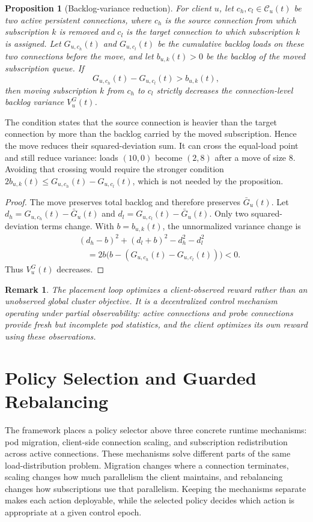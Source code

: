\documentclass[manuscript]{acmart}
\newtheorem{proposition}{Proposition}
\newtheorem{remark}{Remark}
\begin{document}
\begin{proposition}[Backlog-variance reduction]
For client $u$, let $c_h,c_l\in\mathcal{C}_u(t)$ be two active persistent
connections, where $c_h$ is the source connection from which subscription $k$
is removed and $c_l$ is the target connection to which subscription $k$ is
assigned. Let $G_{u,c_h}(t)$ and $G_{u,c_l}(t)$ be the cumulative backlog loads
on these two connections before the move, and let $b_{u,k}(t)>0$ be the backlog
of the moved subscription queue. If
\begin{equation}
	G_{u,c_h}(t)-G_{u,c_l}(t)>b_{u,k}(t),
\end{equation}
then moving subscription $k$ from $c_h$ to $c_l$ strictly decreases the
connection-level backlog variance $V^G_u(t)$.
\end{proposition}

The condition states that the source connection is heavier than the target
connection by more than the backlog carried by the moved subscription. Hence
the move reduces their squared-deviation sum. It can cross the equal-load
point and still reduce variance: loads $(10,0)$ become $(2,8)$ after a move
of size 8. Avoiding that crossing would require the stronger condition
$2b_{u,k}(t)\leq G_{u,c_h}(t)-G_{u,c_l}(t)$, which is not needed by the proposition.

\begin{proof}
The move preserves total backlog and therefore preserves $\bar{G}_u(t)$. Let
$d_h=G_{u,c_h}(t)-\bar{G}_u(t)$ and
$d_l=G_{u,c_l}(t)-\bar{G}_u(t)$. Only two squared-deviation terms change. With
$b=b_{u,k}(t)$, the unnormalized variance change is
\begin{align}
	&(d_h-b)^2+(d_l+b)^2-d_h^2-d_l^2 \nonumber\\
	&\quad =
	2b\bigl(b-(G_{u,c_h}(t)-G_{u,c_l}(t))\bigr)<0.
\end{align}
Thus $V^G_u(t)$ decreases.
\end{proof}

\begin{remark}
The placement loop optimizes a client-observed reward rather than an
unobserved global cluster objective. It is a decentralized control mechanism operating
under partial observability: active connections and probe connections provide
fresh but incomplete pod statistics, and the client optimizes its own reward
using these observations.
\end{remark}

\section{Policy Selection and Guarded Rebalancing}
The framework places a policy selector above three concrete runtime mechanisms:
pod migration, client-side connection scaling, and subscription redistribution
across active connections. These mechanisms solve different parts of the same
load-distribution problem. Migration changes where a connection terminates,
scaling changes how much parallelism the client maintains, and rebalancing
changes how subscriptions use that parallelism. Keeping the mechanisms
separate makes each action deployable, while the selected policy decides which
action is appropriate at a given control epoch.
\end{document}
